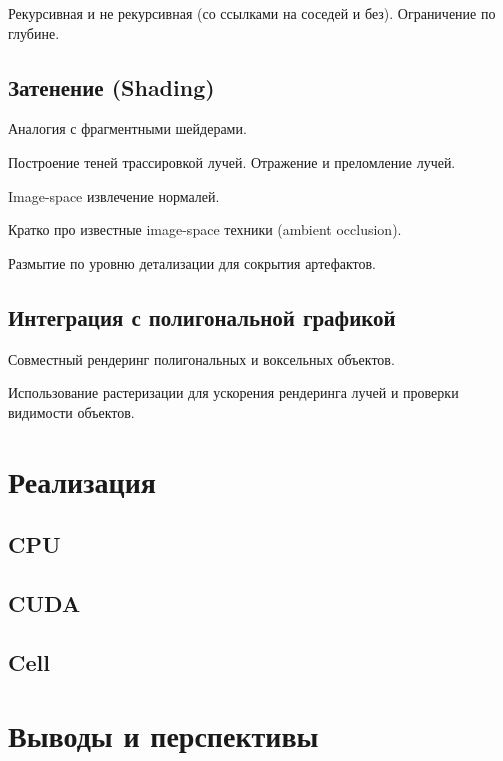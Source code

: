 \documentclass[a4paper,12pt,oneside]{article}
\begin{document}
Рекурсивная и не рекурсивная (со ссылками на соседей и без). Ограничение по глубине.

\subsection{Затенение (Shading)}

Аналогия с фрагментными шейдерами.

Построение теней трассировкой лучей. Отражение и преломление лучей.

Image-space извлечение нормалей.

Кратко про известные image-space техники (ambient occlusion).

Размытие по уровню детализации для сокрытия артефактов.

\subsection{Интеграция с полигональной графикой}

Совместный рендеринг полигональных и воксельных объектов.

Использование растеризации для ускорения рендеринга лучей и проверки видимости объектов.

\section{Реализация}
\label{c:impl}

\subsection{CPU}

\subsection{CUDA}

\subsection{Cell}

\section{Выводы и перспективы}
\end{document}
